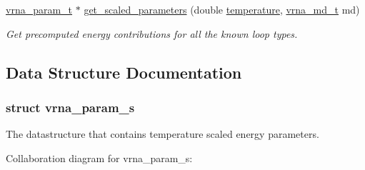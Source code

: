 \begin{DoxyCompactItemize}
\mbox{\hyperlink{group__energy__parameters_ga8a69ca7d787e4fd6079914f5343a1f35}{vrna\+\_\+param\+\_\+t}} $\ast$ \mbox{\hyperlink{group__energy__parameters_ga7fa6a000d7c16feab939f2c4ee626197}{get\+\_\+scaled\+\_\+parameters}} (double \mbox{\hyperlink{group__model__details_gab4b11c8d9c758430960896bc3fe82ead}{temperature}}, \mbox{\hyperlink{group__model__details_ga1f8a10e12a0a1915f2a4eff0b28ea17c}{vrna\+\_\+md\+\_\+t}} md)
\begin{DoxyCompactList}\small\item\em Get precomputed energy contributions for all the known loop types. \end{DoxyCompactList}\end{DoxyCompactItemize}


\subsection{Data Structure Documentation}
\label{structvrna__param__s}
\subsubsection{struct vrna\+\_\+param\+\_\+s}
The datastructure that contains temperature scaled energy parameters. 

Collaboration diagram for vrna\+\_\+param\+\_\+s\+:
